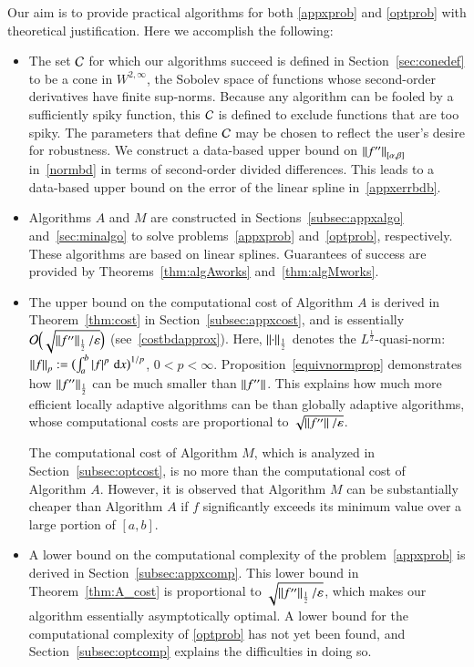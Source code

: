\documentclass[review]{elsarticle}
\newcommand{\abstol}{\varepsilon}
\theoremstyle{definition}
\renewcommand{\cw}{W}
\begin{document}
Our aim is to provide practical algorithms for both \eqref{appxprob} and  \eqref{optprob} with theoretical justification.  Here we accomplish the following:
\begin{itemize}

\item The set $\cc$ for which our algorithms succeed is defined in Section~\ref{sec:conedef} to be a cone in $\cw^{2,\infty}$, the Sobolev space of functions whose second-order derivatives have finite sup-norms.  Because any algorithm can be fooled by a sufficiently spiky function, this $\cc$ is defined to exclude functions that are too spiky.  The parameters that define $\cc$ may be chosen to reflect the user's desire for robustness.  We construct a data-based upper bound on $\norm[{[\alpha,\beta]}]{f''}$ in~\eqref{normbd} in terms of second-order divided differences.  This leads to a data-based upper bound on the error of the linear spline in~\eqref{appxerrbdb}.

\item Algorithms $A$ and $M$ are constructed in Sections~\ref{subsec:appxalgo} and~\ref{sec:minalgo} to solve problems~\eqref{appxprob}
and~\eqref{optprob}, respectively.  These algorithms are based on linear splines.  Guarantees of success are provided by Theorems~\ref{thm:algAworks}
and~\ref{thm:algMworks}.

\item The upper bound on the computational cost of Algorithm $A$ is derived in Theorem~\ref{thm:cost} in Section~\ref{subsec:appxcost},  and is essentially $\Order\Bigl(\sqrt{\norm[\frac12]{f''}/\abstol}\Bigr)$ (see~\eqref{costbdapprox}).  Here, $\norm[\frac12]{\cdot}$ denotes the $L^{\frac12}$-quasi-norm:  $\norm[p]{f} := \bigl(\int_a^b \abs{f}^p \, \dif x \bigr)^{1/p}$, $0 < p < \infty$.  Proposition~\ref{equivnormprop} demonstrates how $\norm[\frac12]{f''}$ can be much smaller than $\norm{f''}$.  This explains how much more efficient locally adaptive algorithms can be than globally adaptive algorithms, whose computational costs  are proportional to $\sqrt{\norm{f''}/\abstol}$.

The computational cost of Algorithm $M$, which is analyzed in Section~\ref{subsec:optcost}, is no more than the computational cost of Algorithm $A$.  However, it is observed that Algorithm $M$ can be substantially cheaper than Algorithm $A$ if $f$ significantly exceeds its minimum value over a large portion of $[a,b]$.

\item A lower bound on the computational complexity of the problem~\eqref{appxprob} is derived in Section~\ref{subsec:appxcomp}.  This lower bound in Theorem~\ref{thm:A_cost} is proportional to $\sqrt{\norm[\frac12]{f''}/\abstol}$, which makes our algorithm essentially asymptotically optimal.  A lower bound for the computational complexity of  \eqref{optprob} has not yet been found, and Section~\ref{subsec:optcomp} explains the difficulties in doing so.


\end{itemize}
\end{document}
